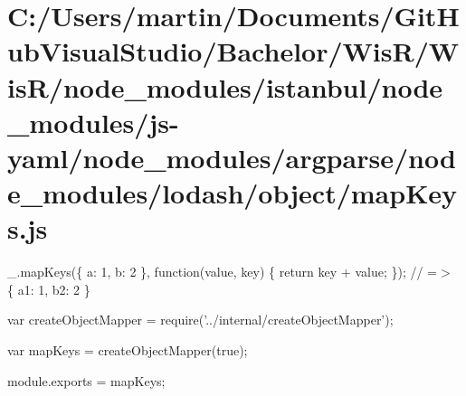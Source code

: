 \hypertarget{_c_1_2_users_2martin_2_documents_2_git_hub_visual_studio_2_bachelor_2_wis_r_2_wis_r_2node_module996dbed9b6932ad7b213a90e4736713a}{}\section{C\+:/\+Users/martin/\+Documents/\+Git\+Hub\+Visual\+Studio/\+Bachelor/\+Wis\+R/\+Wis\+R/node\+\_\+modules/istanbul/node\+\_\+modules/js-\/yaml/node\+\_\+modules/argparse/node\+\_\+modules/lodash/object/map\+Keys.\+js}
\+\_\+.\+map\+Keys(\{ \textquotesingle{}a\textquotesingle{}\+: 1, \textquotesingle{}b\textquotesingle{}\+: 2 \}, function(value, key) \{ return key + value; \}); // =$>$ \{ \textquotesingle{}a1\textquotesingle{}\+: 1, \textquotesingle{}b2\textquotesingle{}\+: 2 \}


\begin{DoxyCodeInclude}
var createObjectMapper = require(\textcolor{stringliteral}{'../internal/createObjectMapper'});

var mapKeys = createObjectMapper(\textcolor{keyword}{true});

module.exports = mapKeys;
\end{DoxyCodeInclude}
 